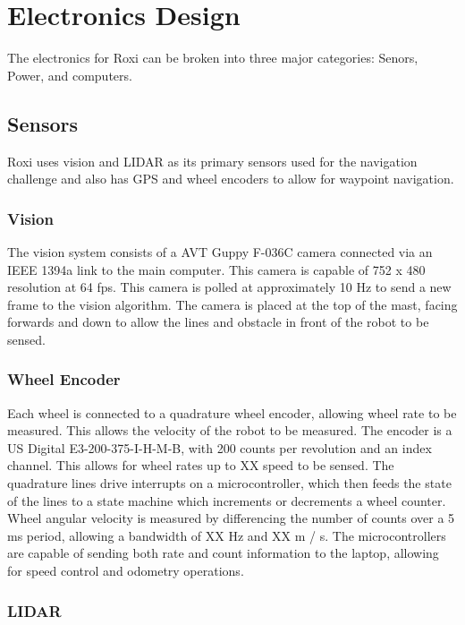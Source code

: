 \section{Electronics Design}

The electronics for Roxi can be broken into three major categories: Senors, Power, and computers.

\subsection{Sensors}

Roxi uses vision and LIDAR as its primary sensors used for the navigation challenge and also has GPS and wheel encoders to allow for waypoint navigation.

\subsubsection{Vision}

The vision system consists of a AVT Guppy F-036C camera connected via an IEEE 1394a link to the main computer. This camera is capable of 752 x 480 resolution at 64 fps. This camera is polled at approximately 10 Hz to send a new frame to the vision algorithm.  The camera is placed at the top of the mast, facing forwards and down to allow the lines and obstacle in front of the robot to be sensed.

\subsubsection{Wheel Encoder}

Each wheel is connected to a quadrature wheel encoder, allowing wheel rate to be measured. This allows the velocity of the robot to be measured. The encoder is a US Digital E3-200-375-I-H-M-B, with 200 counts per revolution and an index channel. This allows for wheel rates up to XX speed to be sensed. The quadrature lines drive interrupts on a microcontroller, which then feeds the state of the lines to a state machine which increments or decrements a wheel counter. Wheel angular velocity is measured by differencing the number of counts over a 5 ms period, allowing a bandwidth of XX Hz and XX m / s. The microcontrollers are capable of sending both rate and count information to the laptop, allowing for speed control and odometry operations.

\subsubsection{LIDAR}


